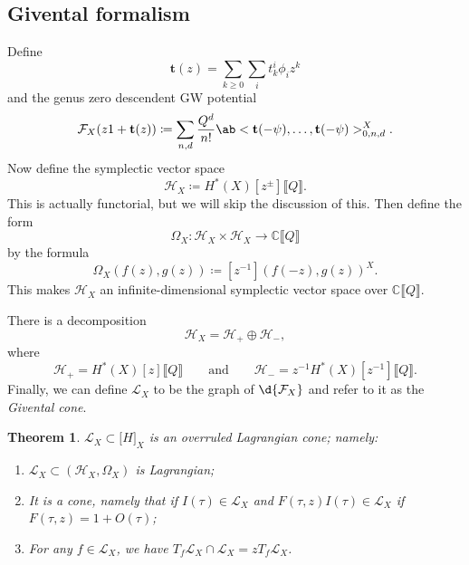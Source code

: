 \documentclass{amsart}
\newtheorem{thm}{Theorem}[section]
\theoremstyle{definition}
\theoremstyle{remark}
\theoremstyle{plain}
\theoremstyle{definition}
\theoremstyle{remark}
\newcommand{\C}{\mathbb{C}}
\renewcommand{\mc}[1]{\mathcal{#1}}
\newcommand{\mbf}[1]{\mathbf{#1}}
\newcommand{\bt}{\mbf{t}}
\newcommand{\1}{\mathbf{1}}
\newcommand{\2}{\mathbf{2}}
\newcommand{\3}{\mathbf{3}}
\newcommand{\ps}[1]{\lBrack #1 \rBrack}
\begin{document}
\subsection{Givental formalism}%
\label{sub:Givental formalism}

Define
\[ \bt(z) = \sum_{k \geq 0} \sum_i t_k^i \phi_i z^k \]
and the genus zero descendent GW potential
\[ \mc{F}_X (z 1 + \bt(z)) \coloneqq \sum_{n, d} \frac{Q^d}{n!}\ab<\bt(-\psi), \ldots, \bt(-\psi)>_{0,n,d}^X. \]
Now define the symplectic vector space
\[ \mc{H}_X \coloneqq H^*(X)[z^{\pm}] \ps{Q}. \]
This is actually functorial, but we will skip the discussion of this. Then define the form
\[ \Omega_X \colon \mc{H}_X \times \mc{H}_X \to \C\ps{Q} \]
by the formula
\[ \Omega_X(f(z), g(z)) \coloneqq [z^{-1}] (f(-z), g(z))^X. \]
This makes \(\mc{H}_X\) an infinite-dimensional symplectic vector space over \(\C\ps{Q}\).

There is a decomposition
\[ \mc{H}_X = \mc{H}_+ \oplus \mc{H}_-, \]
where
\[ \mc{H}_+ = H^*(X)[z]\ps{Q} \qquad \text{and} \qquad \mc{H}_- = z^{-1} H^*(X)[z^{-1}]\ps{Q}. \]
Finally, we can define \(\mc{L}_X\) to be the graph of \(\d{\mc{F}_X}\) and refer to it as the \textit{Givental cone}.

\begin{thm}
    \(\mc{L}_X \subset \mc[H]_X\) is an overruled Lagrangian cone; namely:
    \begin{enumerate}
        \item \(\mc{L}_X \subset (\mc{H}_X, \Omega_X)\) is Lagrangian;
        \item It is a cone, namely that if \(I(\tau) \in \mc{L}_X\) and \(F(\tau, z)I(\tau) \in \mc{L}_X\) if \(F(\tau, z) = 1 + O(\tau)\);
        \item For any \(f \in \mc{L}_X\), we have \(T_f \mc{L}_X \cap \mc{L}_X = z T_f \mc{L}_X\).
    \end{enumerate}
\end{thm}
\end{document}
